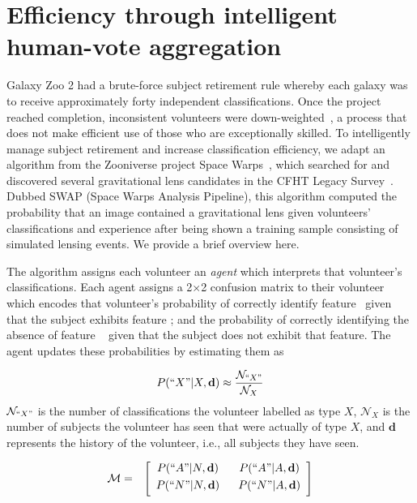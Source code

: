 \section{Efficiency through intelligent human-vote aggregation}\label{sec: SWAP}

Galaxy Zoo 2 had a brute-force subject retirement rule whereby each galaxy was to 
receive approximately forty independent classifications.  Once the project reached 
completion, inconsistent volunteers were down-weighted~\citep{Willett2013}, 
a process that does not make efficient use of those who are exceptionally skilled. 
To intelligently manage subject retirement and increase classification efficiency, 
we adapt an algorithm from the Zooniverse  project Space Warps~\citep{Marshall2016}, 
which searched for and discovered several gravitational lens candidates in the 
CFHT Legacy Survey~\citep{More2016}.  Dubbed SWAP (Space Warps Analysis Pipeline), 
 this algorithm computed the probability that an image contained a gravitational lens 
given volunteers' classifications and experience after being shown a training sample 
consisting of simulated lensing events.  We provide a brief overview here.  

The algorithm assigns each volunteer an \textit{agent} which interprets that 
volunteer's classifications. Each agent assigns a 2$\times$2 confusion matrix 
to their volunteer which encodes that volunteer's probability of correctly 
identify feature \A~given that the subject exhibits feature \A; 
and the probability of correctly identifying the absence of feature 
\A~ given that the subject does not exhibit that feature. 
The agent updates these probabilities by estimating them as 

\begin{equation}
P(``X" | X, \mathbf{d}) \approx \frac{\mathcal{N}_{``X"}}{\mathcal{N}_{X}}
\end{equation}
 $\mathcal{N}_{``X"}$ is the number of classifications the volunteer labelled as type $X$, 
$\mathcal{N}_X$ is the number of subjects the volunteer has seen that were actually of type $X$,
and $\mathbf{d}$ represents the history of the volunteer, i.e., all subjects they have seen.

\begin{eqnarray}
\mathcal{M} & = & \left[
	\begin{array}{cc}
		P(``A"|N, \mathbf{d}) ~~& P(``A" | A, \mathbf{d}) \\[0.3em]
		P(``N"|N, \mathbf{d})~~& P(``N"|A, \mathbf{d}) \\[0.3em]
	\end{array}\right]
\end{eqnarray}

